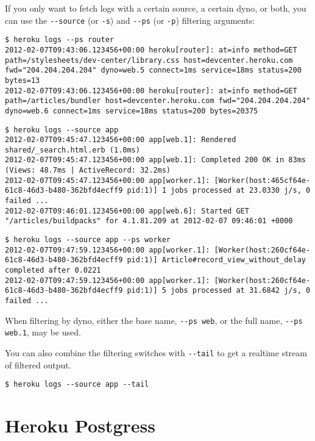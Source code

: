 
If you only want to fetch logs with a certain source, a certain
dyno, or both, you can use the \verb|--source| (or \verb|-s|) and
\verb|--ps| (or \verb|-p|) filtering arguments:
\begin{verbatim}
$ heroku logs --ps router
2012-02-07T09:43:06.123456+00:00 heroku[router]: at=info method=GET path=/stylesheets/dev-center/library.css host=devcenter.heroku.com fwd="204.204.204.204" dyno=web.5 connect=1ms service=18ms status=200 bytes=13
2012-02-07T09:43:06.123456+00:00 heroku[router]: at=info method=GET path=/articles/bundler host=devcenter.heroku.com fwd="204.204.204.204" dyno=web.6 connect=1ms service=18ms status=200 bytes=20375
\end{verbatim}

\begin{verbatim}
$ heroku logs --source app
2012-02-07T09:45:47.123456+00:00 app[web.1]: Rendered shared/_search.html.erb (1.0ms)
2012-02-07T09:45:47.123456+00:00 app[web.1]: Completed 200 OK in 83ms (Views: 48.7ms | ActiveRecord: 32.2ms)
2012-02-07T09:45:47.123456+00:00 app[worker.1]: [Worker(host:465cf64e-61c8-46d3-b480-362bfd4ecff9 pid:1)] 1 jobs processed at 23.0330 j/s, 0 failed ...
2012-02-07T09:46:01.123456+00:00 app[web.6]: Started GET "/articles/buildpacks" for 4.1.81.209 at 2012-02-07 09:46:01 +0000
\end{verbatim}

\begin{verbatim}
$ heroku logs --source app --ps worker
2012-02-07T09:47:59.123456+00:00 app[worker.1]: [Worker(host:260cf64e-61c8-46d3-b480-362bfd4ecff9 pid:1)] Article#record_view_without_delay completed after 0.0221
2012-02-07T09:47:59.123456+00:00 app[worker.1]: [Worker(host:260cf64e-61c8-46d3-b480-362bfd4ecff9 pid:1)] 5 jobs processed at 31.6842 j/s, 0 failed ...
\end{verbatim}

When filtering by dyno, either the base name, \verb|--ps web|, or the full
name, \verb|--ps web.1|, may be used.

You can also combine the filtering switches with \verb|--tail| to get a
realtime stream of filtered output.
\begin{verbatim}
$ heroku logs --source app --tail
\end{verbatim}

\section{Heroku Postgress}

